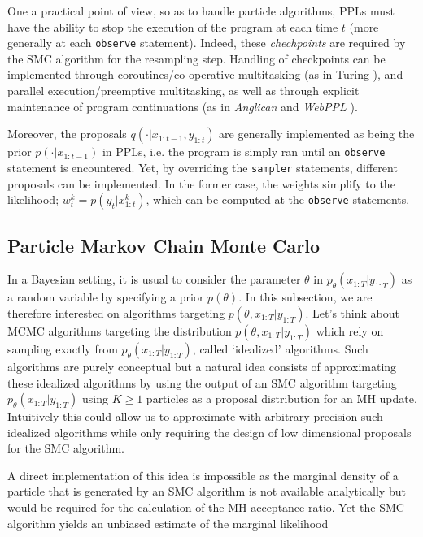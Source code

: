 One a practical point of view, so as to handle particle algorithms, \glspl{PPL} must have the ability to stop the execution of the program at each time $t$ (more generally at each \texttt{observe} statement). Indeed, these \textit{chechpoints} are required by the \gls{SMC} algorithm for the resampling step.
Handling of checkpoints can be implemented through coroutines/co-operative multitasking (as in Turing \cite{Turing}), and parallel execution/preemptive multitasking, as well as through explicit maintenance of program continuations (as in \emph{Anglican} \cite{wood-aistats-2014} and \emph{WebPPL} \cite{dippl}).

Moreover, the proposals $q(\cdot|x_{1:t-1},y_{1:t})$ are generally implemented as being the prior $p(\cdot|x_{1:t-1})$ in \glspl{PPL}, i.e. the program is simply ran until an \texttt{observe} statement is encountered. Yet, by overriding the \texttt{sampler} statements, different proposals can be implemented. In the former case, the weights simplify to the likelihood; $w_{t}^k = p(y_{t}|x^k_{1:t})$, which can be computed at the \texttt{observe} statements. 

\subsection{Particle Markov Chain Monte Carlo}
In a Bayesian setting, it is usual to consider the parameter $\theta$ in $p_\theta(x_{1:T}|y_{1:T})$ as a random variable by specifying a prior $p(\theta)$. In this subsection, we are therefore interested on algorithms targeting
$p(\theta, x_{1:T}|y_{1:T})$.
Let's think about \gls{MCMC} algorithms targeting the distribution $p(\theta, x_{1:T}|y_{1:T})$ which rely on sampling exactly from $p_\theta(x_{1:T}|y_{1:T})$, called ‘idealized’ algorithms.
Such algorithms are purely conceptual but a natural idea consists of approximating these idealized algorithms by using the output of an \gls{SMC} algorithm targeting $p_\theta(x_{1:T}|y_{1:T})$ using $K \ge 1$ particles as a proposal distribution for an \gls{MH} update.
Intuitively this could allow us to approximate with arbitrary precision such idealized algorithms while only requiring the design of low dimensional proposals for the \gls{SMC} algorithm.

A direct implementation of this idea is impossible as the marginal density of a particle that is generated by an \gls{SMC} algorithm is not available analytically but would be required for the calculation of the \gls{MH} acceptance ratio. Yet the \gls{SMC} algorithm yields an unbiased estimate of the marginal likelihood

